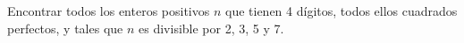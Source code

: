Encontrar todos los enteros positivos $n$ que tienen 4 dígitos, todos ellos cuadrados perfectos, y tales que $n$ es divisible por 2, 3, 5 y 7.
